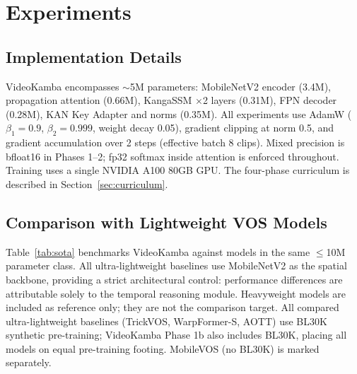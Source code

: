 \documentclass[sigconf]{acmart}
\begin{document}
\section{Experiments}
\label{sec:experiments}

\subsection{Implementation Details}
VideoKamba encompasses $\sim$5M parameters: MobileNetV2 encoder (3.4M), propagation attention (0.66M), KangaSSM $\times$2 layers (0.31M), FPN decoder (0.28M), KAN Key Adapter and norms (0.35M). All experiments use AdamW ($\beta_1=0.9$, $\beta_2=0.999$, weight decay 0.05), gradient clipping at norm 0.5, and gradient accumulation over 2 steps (effective batch 8 clips). Mixed precision is bfloat16 in Phases 1--2; fp32 softmax inside attention is enforced throughout. Training uses a single NVIDIA A100 80GB GPU. The four-phase curriculum is described in Section~\ref{sec:curriculum}.

\subsection{Comparison with Lightweight VOS Models}
Table~\ref{tab:sota} benchmarks VideoKamba against models in the same $\leq$10M parameter class. All ultra-lightweight baselines use MobileNetV2 as the spatial backbone, providing a strict architectural control: performance differences are attributable solely to the temporal reasoning module. Heavyweight models are included as reference only; they are not the comparison target. All compared ultra-lightweight baselines (TrickVOS, WarpFormer-S, AOTT) use BL30K synthetic pre-training; VideoKamba Phase 1b also includes BL30K, placing all models on equal pre-training footing. MobileVOS (no BL30K) is marked separately.
\end{document}
